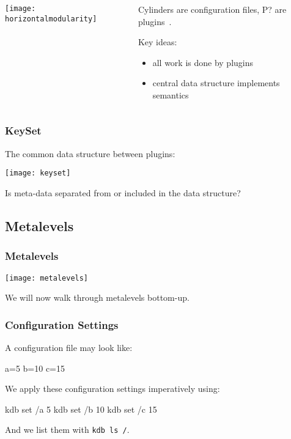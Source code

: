 \begin{frame}
	\begin{columns}[c]
	\begin{column}{7cm}
	\texttt{[image: horizontalmodularity]}
	\end{column}
	\begin{column}{4cm}
	Cylinders are configuration files, P? are plugins~\cite{raab2016improving}.

	Key ideas:
	\begin{itemize}
	\item all work is done by plugins
	\item central data structure implements semantics
	\end{itemize}
	\end{column}
	\end{columns}
\end{frame}

\begin{frame}
	\frametitle{KeySet}

	The common data structure between plugins:
	\vspace{1cm}

	\texttt{[image: keyset]}
\end{frame}

\begin{assignment}
	\begin{task}
	Is meta-data separated from or included in the data structure?
	\end{task}
\end{assignment}

\subsection{Metalevels}

\begin{frame}
	\frametitle{Metalevels}
	\texttt{[image: metalevels]}

	We will now walk through metalevels bottom-up.
\end{frame}

\begin{frame}[fragile]
	\frametitle{Configuration Settings}

	A configuration file may look like:

	\begin{code}[language=CfgElektra]
	a=5
	b=10
	c=15
	\end{code}

	We apply these configuration settings imperatively using:

	\begin{code}[language=bash]
	kdb set /a 5
	kdb set /b 10
	kdb set /c 15
	\end{code}

	And we list them with \lstinline[language=bash,morekeywords={ls},showspaces=no]^kdb ls /^.
\end{frame}

